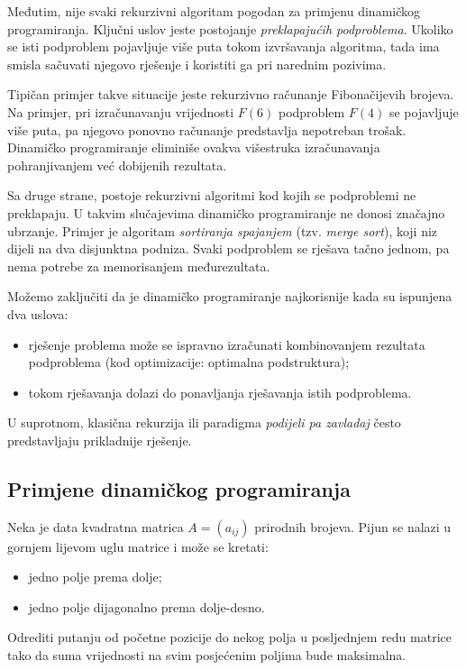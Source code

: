 Međutim, nije svaki rekurzivni algoritam pogodan za primjenu dinamičkog programiranja. Ključni uslov jeste postojanje \textit{preklapajućih podproblema}. Ukoliko se isti podproblem pojavljuje više puta tokom izvršavanja algoritma, tada ima smisla sačuvati njegovo rješenje i koristiti ga pri narednim pozivima.

Tipičan primjer takve situacije jeste rekurzivno računanje Fibonačijevih brojeva. Na primjer, pri izračunavanju vrijednosti $F(6)$ podproblem $F(4)$ se pojavljuje više puta, pa njegovo ponovno računanje predstavlja nepotreban trošak. Dinamičko programiranje eliminiše ovakva višestruka izračunavanja pohranjivanjem već dobijenih rezultata.

Sa druge strane, postoje rekurzivni algoritmi kod kojih se podproblemi ne preklapaju. U takvim slučajevima dinamičko programiranje ne donosi značajno ubrzanje. Primjer je algoritam \emph{sortiranja spajanjem} (tzv. \emph{merge sort}), koji niz dijeli na dva disjunktna podniza. Svaki podproblem se rješava tačno jednom, pa nema potrebe za memorisanjem međurezultata.

Možemo zaključiti da je dinamičko programiranje najkorisnije kada su ispunjena dva uslova:

\begin{itemize}
	\item rješenje problema može se ispravno izračunati kombinovanjem rezultata podproblema (kod optimizacije: optimalna podstruktura);
	\item tokom rješavanja dolazi do ponavljanja rješavanja istih podproblema.
\end{itemize}

U suprotnom, klasična rekurzija ili paradigma \emph{podijeli pa zavladaj} često predstavljaju prikladnije rješenje.

\subsection{Primjene dinamičkog programiranja}

\begin{example}
	Neka je data kvadratna matrica $A=(a_{ij})$ prirodnih brojeva. Pijun se nalazi u gornjem lijevom uglu matrice i može se kretati:
	\begin{itemize}
		\item jedno polje prema dolje;
		\item jedno polje dijagonalno prema dolje-desno.
	\end{itemize}
	
	Odrediti putanju od početne pozicije do nekog polja u posljednjem redu matrice tako da suma vrijednosti na svim posjećenim poljima bude maksimalna.
	
\end{example}

